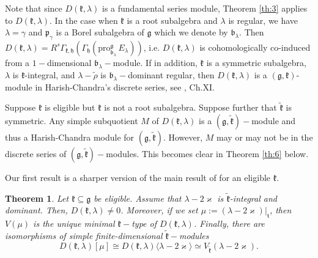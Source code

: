 \documentclass[10pt]{amsart}
\newtheorem{theo}{Theorem}[section]
\newcommand{\pro}{\mathrm{pro}}
\newcommand{\bb}{\mathfrak{b}}
\renewcommand{\gg}{\mathfrak{g}}
\newcommand{\hh}{\mathfrak{h}}
\newcommand{\kk}{\mathfrak{k}}
\newcommand{\pp}{\mathfrak{p}}
\renewcommand{\tt}{\mathfrak{t}}
\begin{document}
Note that since $D(\kk,\lambda)$ is a fundamental series module, Theorem \ref{th:3} applies to $D(\kk,\lambda)$. In the case when $\kk$ is a root subalgebra and $\lambda$ is regular, we have $\lambda = \gamma$ and $\pp_{\gamma}$ is a Borel subalgebra of $\gg$ which we denote by $\bb_{\lambda}$. Then $D(\kk,\lambda) = R^s\Gamma_{\kk,\hh}(\Gamma_\hh(\pro^\gg_{\bb_\lambda}\,E_\lambda))$, i.e. $D(\kk,\lambda)$ is cohomologically co-induced from a $1-$dimensional $\bb_{\lambda}-$module. If in addition, $\kk$ is a symmetric subalgebra, $\lambda$ is $\kk$-integral, and $\lambda - \tilde{\rho}$ is $\bb_{\lambda}-$dominant regular, then $D(\kk,\lambda)$ is a $(\gg,\kk)$-module in Harish-Chandra's discrete series, see \cite{KV}, Ch.XI.

Suppose $\kk$ is eligible but $\kk$ is not a root subalgebra. Suppose further that $\tilde{\kk}$ is symmetric. Any simple subquotient $M$ of $D(\kk,\lambda)$ is a $(\gg,\tilde{\kk})-$module and thus a Harish-Chandra module for $(\gg,\tilde{\kk})$. However, $M$ may or may not be in the discrete series of $(\gg,\tilde{\kk})-$modules. This becomes clear in Theorem \ref{th:6} below.

Our first result is a sharper version of the main result of \cite{PZ3} for an eligible $\kk$. %

\begin{theo}\label{th3}
    Let $\kk\subseteq\gg$ be eligible. Assume that $\lambda-2\varkappa$ is $\tilde{\kk}$-integral and dominant. Then, $D(\kk,\lambda) \neq 0$. Moreover, if we set $\mu := (\lambda - 2\varkappa)|_{\tt}$, then $V(\mu)$ is the unique minimal $\kk-$type of $D(\kk,\lambda)$. Finally, there are isomorphisms of simple finite-dimensional $\tilde{\kk}-$modules
$$D(\kk,\lambda)[\mu] \cong D(\kk,\lambda)\langle\lambda - 2\varkappa\rangle \simeq V_{\tilde{\kk}}(\lambda - 2\varkappa).$$

\end{theo}
\end{document}
